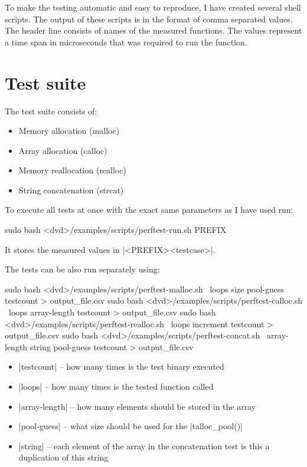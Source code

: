 To make the testing automatic and easy to reproduce, I have created several
shell scripts. The output of these scripts is in the format of comma separated
values. The header line consists of names of the measured functions. The values
represent a time span in microseconds that was required to run the function.

\section{Test suite}

The test suite consists of:
\begin{itemize}
  \item Memory allocation (malloc)
  \item Array allocation (calloc)
  \item Memory reallocation (realloc)
  \item String concatenation (strcat)
\end{itemize}

\noindent
To execute all tests at once with the exact same parameters as I have used run:
\begin{commandline}
sudo bash <dvd>/examples/scripts/perftest-run.sh PREFIX
\end{commandline}
\funclistend
It stores the measured values in |<PREFIX><testcase>|.

\noindent
The tests can be also run separately using:
\begin{commandline}
sudo bash <dvd>/examples/scripts/perftest-malloc.sh
     \ loops size pool-guess testcount > output_file.csv
sudo bash <dvd>/examples/scripts/perftest-calloc.sh
     \ loops array-length testcount > output_file.csv
sudo bash <dvd>/examples/scripts/perftest-realloc.sh
     \ loops increment testcount > output_file.csv
sudo bash <dvd>/examples/scripts/perftest-concat.sh
     \ array-length string pool-guess testcount > output_file.csv
\end{commandline}
\begin{itemize}
  \item |testcount| -- how many times is the test binary executed
  \item |loops| -- how many times is the tested function called
  \item |array-length| -- how many elements should be stored in the array
  \item |pool-guess| -- what size should be used for the |talloc_pool()|
  \item |string| -- each element of the array in the concatenation test is this
  a duplication of this string
\end{itemize}

